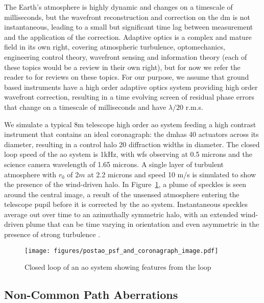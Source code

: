 \documentclass[letterpaper]{ar-1col}
\begin{document}
The Earth's atmosphere is highly dynamic and changes on a timescale of milliseconds, but the wavefront reconstruction and correction on the \ac{dm} is not instantaneous, leading to a small but significant time lag between measurement and the application of the correction.
%
Adaptive optics is a complex and mature field in its own right, covering atmospheric turbulence, optomechanics, engineering control theory, wavefront sensing and information theory (each of these topics would be a review in their own right), but for now we refer the reader to \citet{Guyon18} for reviews on these topics. 
%
For our purpose, we assume that ground based instruments have a high order adaptive optics system providing high order wavefront correction, resulting in a time evolving screen of residual phase errors that change on a timescale of milliseconds and have $\lambda/20$ r.m.s.

We simulate a typical 8m telescope high order \ac{ao} system feeding a high contrast instrument that contains an ideal coronagraph: the \ac{dm}has 40 actuators across its diameter, resulting in a control halo 20 diffraction widths in diameter. 
%
The closed loop speed of the \ac{ao} system is 1kHz, with \ac{wfs} observing at 0.5 microns and the science camera wavelength of 1.65 microns.
%
A single layer of turbulent atmosphere with $r_0$ of $2m$ at 2.2 microns and speed 10 m/s is simulated to show the presence of the wind-driven halo.
%
In Figure~\ref{fig:ao}, a plume of speckles is seen around the central image, a result of the unsensed atmosphere entering the telescope pupil before it is corrected by the \ac{ao} system. 
%
Instantaneous speckles average out over time to an azimuthally symmetric halo, with an extended wind-driven plume that can be time varying in orientation and even asymmetric in the presence of strong turbulence \citep{Cantalloube18}.


\begin{figure}[ht]
  \centering
  \texttt{[image: figures/postao\_psf\_and\_coronagraph\_image.pdf]}
  \caption{Closed loop of an \ac{ao} system showing features from the loop}
  \label{fig:ao}
\end{figure}

\subsection{Non-Common Path Aberrations}
\end{document}
